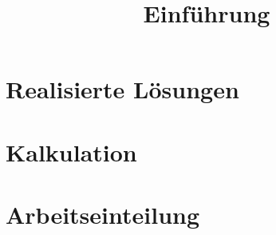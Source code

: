 

\title{Einführung}





\section{Realisierte Lösungen}

\section{Kalkulation}

\section{Arbeitseinteilung}